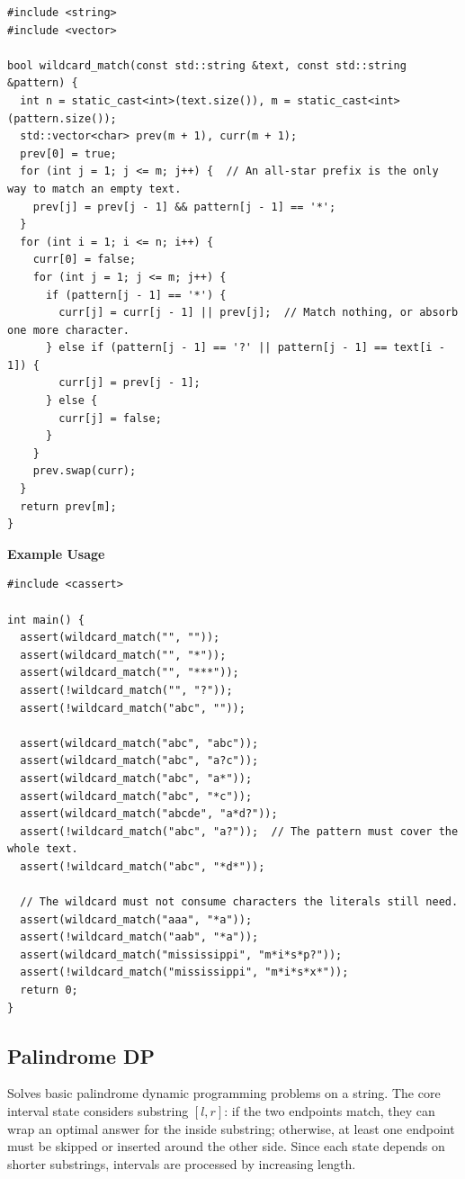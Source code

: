 \begin{lstlisting}[style=cpp]
#include <string>
#include <vector>

bool wildcard_match(const std::string &text, const std::string &pattern) {
  int n = static_cast<int>(text.size()), m = static_cast<int>(pattern.size());
  std::vector<char> prev(m + 1), curr(m + 1);
  prev[0] = true;
  for (int j = 1; j <= m; j++) {  // An all-star prefix is the only way to match an empty text.
    prev[j] = prev[j - 1] && pattern[j - 1] == '*';
  }
  for (int i = 1; i <= n; i++) {
    curr[0] = false;
    for (int j = 1; j <= m; j++) {
      if (pattern[j - 1] == '*') {
        curr[j] = curr[j - 1] || prev[j];  // Match nothing, or absorb one more character.
      } else if (pattern[j - 1] == '?' || pattern[j - 1] == text[i - 1]) {
        curr[j] = prev[j - 1];
      } else {
        curr[j] = false;
      }
    }
    prev.swap(curr);
  }
  return prev[m];
}
\end{lstlisting}
\textbf{Example Usage}\par
\begin{lstlisting}[style=cpp]
#include <cassert>

int main() {
  assert(wildcard_match("", ""));
  assert(wildcard_match("", "*"));
  assert(wildcard_match("", "***"));
  assert(!wildcard_match("", "?"));
  assert(!wildcard_match("abc", ""));

  assert(wildcard_match("abc", "abc"));
  assert(wildcard_match("abc", "a?c"));
  assert(wildcard_match("abc", "a*"));
  assert(wildcard_match("abc", "*c"));
  assert(wildcard_match("abcde", "a*d?"));
  assert(!wildcard_match("abc", "a?"));  // The pattern must cover the whole text.
  assert(!wildcard_match("abc", "*d*"));

  // The wildcard must not consume characters the literals still need.
  assert(wildcard_match("aaa", "*a"));
  assert(!wildcard_match("aab", "*a"));
  assert(wildcard_match("mississippi", "m*i*s*p?"));
  assert(!wildcard_match("mississippi", "m*i*s*x*"));
  return 0;
}
\end{lstlisting}
\subsection{Palindrome DP}
\label{sec:3.6.5}
Solves basic palindrome dynamic programming problems on a string. The core interval state considers substring $[l, r]$: if the two endpoints match, they can wrap an optimal answer for the inside substring; otherwise, at least one endpoint must be skipped or inserted around the other side. Since each state depends on shorter substrings, intervals are processed by increasing length.

